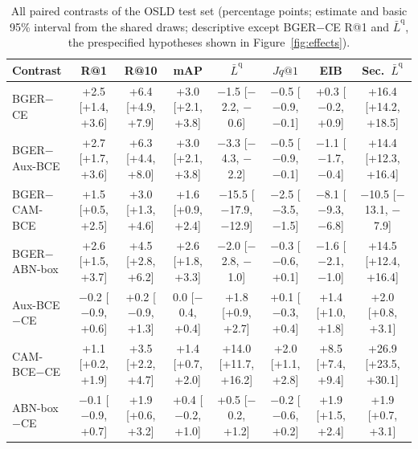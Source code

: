 \begin{table}[t]
\centering\footnotesize\setlength{\tabcolsep}{3pt}
\caption{All paired contrasts of the OSLD test set (percentage points; estimate and basic 95\% interval from the shared draws; descriptive except BGER$-$CE R@1 and $\bar L^{\mathrm q}$, the prespecified hypotheses shown in Figure~\ref{fig:effects}).}
\label{tab:osld-contrasts-all}
\begin{tabular}{lccccccc}
\toprule
Contrast & R@1 & R@10 & mAP & $\bar L^{\mathrm q}$ & $Jq@1$ & EIB & Sec.\ $\bar L^{\mathrm q}$\\
\midrule
BGER$-$CE & +2.5 [+1.4, +3.6] & +6.4 [+4.9, +7.9] & +3.0 [+2.1, +3.8] & $-$1.5 [$-$2.2, $-$0.6] & $-$0.5 [$-$0.9, $-$0.1] & +0.3 [$-$0.2, +0.9] & +16.4 [+14.2, +18.5]\\
BGER$-$Aux-BCE & +2.7 [+1.7, +3.6] & +6.3 [+4.4, +8.0] & +3.0 [+2.1, +3.8] & $-$3.3 [$-$4.3, $-$2.2] & $-$0.5 [$-$0.9, $-$0.1] & $-$1.1 [$-$1.7, $-$0.4] & +14.4 [+12.3, +16.4]\\
BGER$-$CAM-BCE & +1.5 [+0.5, +2.5] & +3.0 [+1.3, +4.6] & +1.6 [+0.9, +2.4] & $-$15.5 [$-$17.9, $-$12.9] & $-$2.5 [$-$3.5, $-$1.5] & $-$8.1 [$-$9.3, $-$6.8] & $-$10.5 [$-$13.1, $-$7.9]\\
BGER$-$ABN-box & +2.6 [+1.5, +3.7] & +4.5 [+2.8, +6.2] & +2.6 [+1.8, +3.3] & $-$2.0 [$-$2.8, $-$1.0] & $-$0.3 [$-$0.6, +0.1] & $-$1.6 [$-$2.1, $-$1.0] & +14.5 [+12.4, +16.4]\\
Aux-BCE$-$CE & $-$0.2 [$-$0.9, +0.6] & +0.2 [$-$0.9, +1.3] & 0.0 [$-$0.4, +0.4] & +1.8 [+0.9, +2.7] & +0.1 [$-$0.3, +0.4] & +1.4 [+1.0, +1.8] & +2.0 [+0.8, +3.1]\\
CAM-BCE$-$CE & +1.1 [+0.2, +1.9] & +3.5 [+2.2, +4.7] & +1.4 [+0.7, +2.0] & +14.0 [+11.7, +16.2] & +2.0 [+1.1, +2.8] & +8.5 [+7.4, +9.4] & +26.9 [+23.5, +30.1]\\
ABN-box$-$CE & $-$0.1 [$-$0.9, +0.7] & +1.9 [+0.6, +3.2] & +0.4 [$-$0.2, +1.0] & +0.5 [$-$0.2, +1.2] & $-$0.2 [$-$0.6, +0.2] & +1.9 [+1.5, +2.4] & +1.9 [+0.7, +3.1]\\
\bottomrule
\end{tabular}
\end{table}
